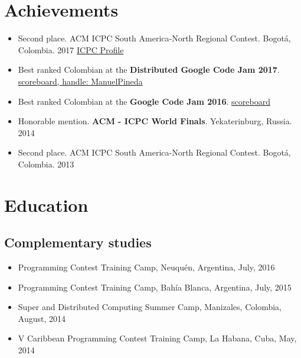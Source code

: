 \documentclass[11pt,a4paper,sans]{moderncv}        %
\begin{document}
\section{Achievements}

\begin{itemize}
  \item{Second place. ACM ICPC South America-North Regional Contest. Bogotá, Colombia. 2017 \href{https://icpc.baylor.edu/ICPCID/13LM2HZ3C9BW}{ICPC Profile}}
  \item{Best ranked Colombian at the \textbf{Distributed Google Code Jam 2017}. \href{https://code.google.com/codejam/contest/3284486/scoreboard\#sp=301}{scoreboard, handle: ManuelPineda}}
  \item{Best ranked Colombian at the \textbf{Google Code Jam 2016}. \href{https://www.go-hero.net/jam/16/regions/Colombia}{scoreboard}}
  \item{Honorable mention. \textbf{ACM - ICPC World Finals}. Yekaterinburg, Russia. 2014}
  \item{Second place. ACM ICPC South America-North Regional Contest. Bogotá, Colombia. 2013}
\end{itemize}

\section{Education}
\subsection{Complementary studies}
\begin{itemize}
  \item{Programming Contest Training Camp, Neuquén, Argentina, July, 2016}
  \item{Programming Contest Training Camp, Bahía Blanca, Argentina, July, 2015}
  \item{Super and Distributed Computing Summer Camp,  Manizales, Colombia, August, 2014}
  \item{V Caribbean Programming Contest Training Camp, La Habana, Cuba, May, 2014}
\end{itemize}
\end{document}
